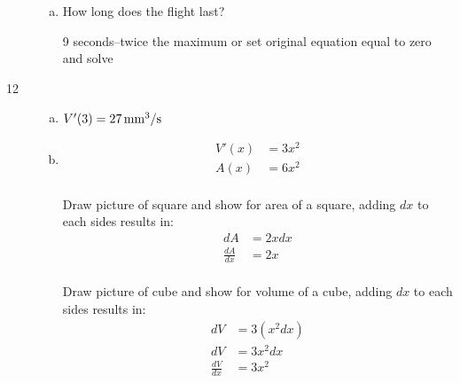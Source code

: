 \documentclass[letterpaper, landscape]{exam}
\begin{document}
\begin{description}
\begin{enumerate}[(a)]
        \item How long does the flight last?
          \begin{solution}
            9 seconds--twice the maximum or set original equation equal to zero and solve
          \end{solution}

      \end{enumerate}

    \item[12]
      \begin{enumerate}[(a)]
        \item 

          \begin{solution}
            $V'(3) = \unit[27]{mm^3/s}$
          \end{solution}

        \item
          \begin{solution}
            \begin{align*}
              V'(x) & = 3x^2 \\
              A(x)  & = 6x^2 \\
            \end{align*}

            Draw picture of square and show for area of a square, adding $dx$ to each sides 
            results in:
            \begin{align*}
              dA            & = 2x dx \\
              \frac{dA}{dx} & = 2x \\
            \end{align*}

            Draw picture of cube and show for volume of a cube, adding $dx$ to each sides 
            results in:
            \begin{align*}
              dV            & = 3 \left( x^2 dx \right) \\
              dV            & = 3 x^2 dx \\
              \frac{dV}{dx} & = 3x^2 \\
            \end{align*}

          \end{solution}

      \end{enumerate}


\end{description}
\end{document}
